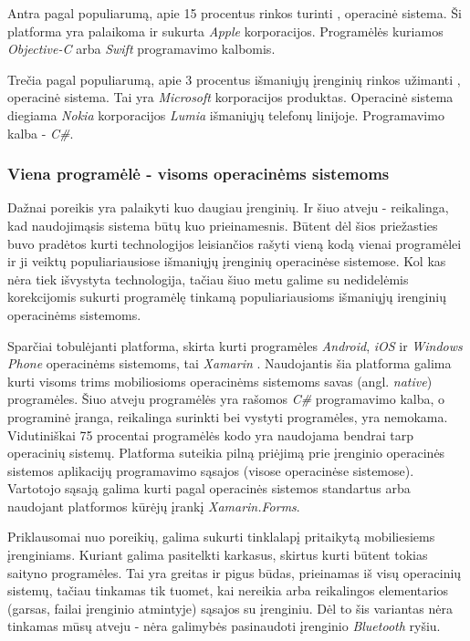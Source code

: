 \documentclass{VUMIFPSkursinis}
\begin{document}
Antra pagal populiarumą, apie 15 procentus rinkos turinti \cite{MarketShareByOS}, operacinė sistema. Ši platforma yra palaikoma ir sukurta \textit{Apple} korporacijos. Programėlės kuriamos \textit{Objective-C} arba \textit{Swift} programavimo kalbomis.

Trečia pagal populiarumą, apie 3 procentus išmaniųjų įrenginių rinkos užimanti \cite{MarketShareByOS}, operacinė sistema. Tai yra \textit{Microsoft} korporacijos produktas. Operacinė sistema diegiama \textit{Nokia} korporacijos \textit{Lumia} išmaniųjų telefonų linijoje. Programavimo kalba - \textit{C\#}.

\subsubsection{Viena programėlė - visoms operacinėms sistemoms}
Dažnai poreikis yra palaikyti kuo daugiau įrenginių. Ir šiuo atveju - reikalinga, kad naudojimąsis sistema būtų kuo prieinamesnis. Būtent dėl šios priežasties buvo pradėtos kurti technologijos leisiančios rašyti vieną kodą vienai programėlei ir ji veiktų populiariausiose išmaniųjų įrenginių operacinėse sistemose. Kol kas nėra tiek išvystyta technologija, tačiau šiuo metu galime su nedidelėmis korekcijomis sukurti programėlę tinkamą populiariausioms išmaniųjų irenginių operacinėms sistemoms.


Sparčiai tobulėjanti platforma, skirta kurti programėles \textit{Android}, \textit{iOS} ir \textit{Windows Phone} operacinėms sistemoms, tai \textit{Xamarin} \cite{xamarin}. Naudojantis šia platforma galima kurti visoms trims mobiliosioms operacinėms sistemoms savas (angl. \textit{native}) programėles. Šiuo atveju programėlės yra rašomos \textit{C\#} programavimo kalba, o programinė įranga, reikalinga surinkti bei vystyti programėles, yra nemokama. Vidutiniškai 75 procentai programėlės kodo yra naudojama bendrai tarp operacinių sistemų. Platforma suteikia pilną priėjimą prie įrenginio operacinės sistemos aplikacijų programavimo sąsajos (visose operacinėse sistemose). Vartotojo sąsają galima kurti pagal operacinės sistemos standartus arba naudojant platformos kūrėjų įrankį \textit{Xamarin.Forms}.


Priklausomai nuo poreikių, galima sukurti tinklalapį pritaikytą mobiliesiems įrenginiams. Kuriant galima pasitelkti karkasus, skirtus kurti būtent tokias saityno programėles. Tai yra greitas ir pigus būdas, prieinamas iš visų operacinių sistemų, tačiau tinkamas tik tuomet, kai nereikia arba reikalingos elementarios (garsas, failai įrenginio atmintyje) sąsajos su įrenginiu. Dėl to šis variantas nėra tinkamas mūsų atveju - nėra galimybės pasinaudoti įrenginio \textit{Bluetooth} ryšiu.
\end{document}
